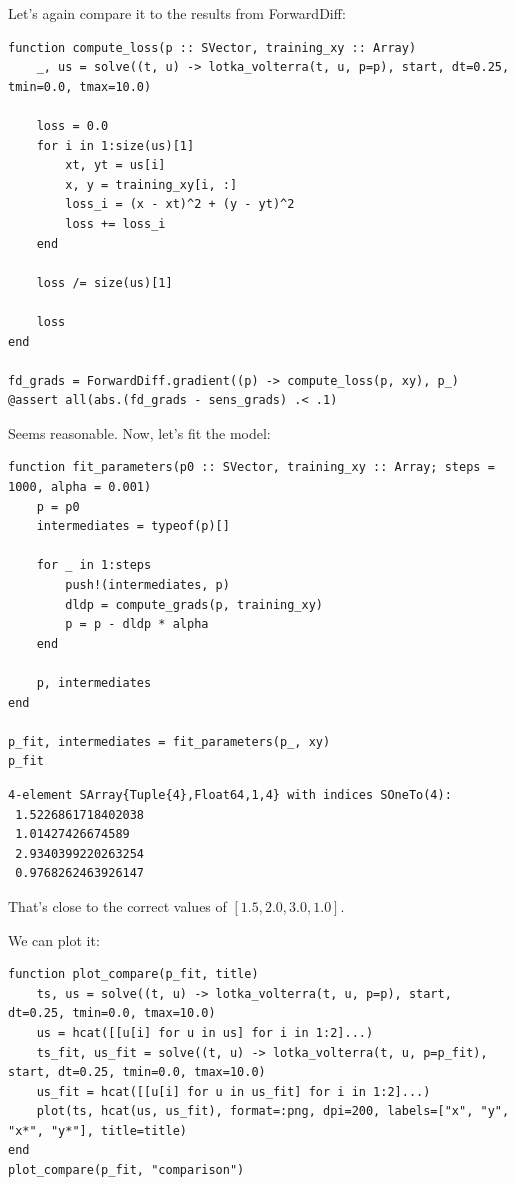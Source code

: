 \documentclass[nobib]{tufte-handout}
\begin{document}
Let's again compare it to the results from ForwardDiff:

\begin{verbatim}
function compute_loss(p :: SVector, training_xy :: Array)
    _, us = solve((t, u) -> lotka_volterra(t, u, p=p), start, dt=0.25, tmin=0.0, tmax=10.0)

    loss = 0.0
    for i in 1:size(us)[1]
        xt, yt = us[i]
        x, y = training_xy[i, :]
        loss_i = (x - xt)^2 + (y - yt)^2
        loss += loss_i
    end

    loss /= size(us)[1]

    loss
end

fd_grads = ForwardDiff.gradient((p) -> compute_loss(p, xy), p_)
@assert all(abs.(fd_grads - sens_grads) .< .1)
\end{verbatim}

Seems reasonable. Now, let's fit the model:

\begin{verbatim}
function fit_parameters(p0 :: SVector, training_xy :: Array; steps = 1000, alpha = 0.001)
    p = p0
    intermediates = typeof(p)[]

    for _ in 1:steps
        push!(intermediates, p)
        dldp = compute_grads(p, training_xy)
        p = p - dldp * alpha
    end

    p, intermediates
end

p_fit, intermediates = fit_parameters(p_, xy)
p_fit
\end{verbatim}

\begin{verbatim}
4-element SArray{Tuple{4},Float64,1,4} with indices SOneTo(4):
 1.5226861718402038
 1.01427426674589  
 2.9340399220263254
 0.9768262463926147
\end{verbatim}


That's close to the correct values of \([1.5, 2.0, 3.0, 1.0]\).

We can plot it:

\begin{verbatim}
function plot_compare(p_fit, title)
    ts, us = solve((t, u) -> lotka_volterra(t, u, p=p), start, dt=0.25, tmin=0.0, tmax=10.0)
    us = hcat([[u[i] for u in us] for i in 1:2]...)
    ts_fit, us_fit = solve((t, u) -> lotka_volterra(t, u, p=p_fit), start, dt=0.25, tmin=0.0, tmax=10.0)
    us_fit = hcat([[u[i] for u in us_fit] for i in 1:2]...)
    plot(ts, hcat(us, us_fit), format=:png, dpi=200, labels=["x", "y", "x*", "y*"], title=title)
end
plot_compare(p_fit, "comparison")
\end{verbatim}
\end{document}
